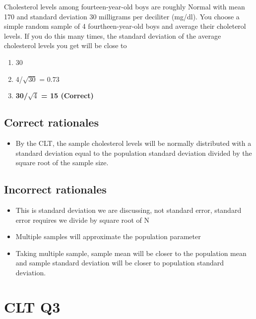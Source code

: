 \documentclass[letterpaper,9pt,twoside,printwatermark=false]{pinp}
\providecommand{\tightlist}{%
  \setlength{\itemsep}{0pt}\setlength{\parskip}{0pt}}
\begin{document}
Cholesterol levels among fourteen-year-old boys are roughly Normal with
mean 170 and standard deviation 30 milligrams per deciliter (mg/dl). You
choose a simple random sample of 4 fourtheen-year-old boys and average
their choleterol levels. If you do this many times, the standard
deviation of the average cholesterol levels you get will be close to

\begin{enumerate}
\def\labelenumi{\alph{enumi})}
\tightlist
\item
  30
\item
  4/\(\sqrt{30}\) = 0.73
\item
  \textbf{30/\(\sqrt{4}\) = 15 (Correct)}
\end{enumerate}

\subsection{Correct rationales}\label{correct-rationales-3}

\begin{itemize}
\tightlist
\item
  By the CLT, the sample cholesterol levels will be normally distributed
  with a standard deviation equal to the population standard deviation
  divided by the square root of the sample size.
\end{itemize}

\subsection{Incorrect rationales}\label{incorrect-rationales-3}

\begin{itemize}
\tightlist
\item
  This is standard deviation we are discussing, not standard error,
  standard error requires we divide by square root of N
\item
  Multiple samples will approximate the population parameter
\item
  Taking multiple sample, sample mean will be closer to the population
  mean and sample standard deviation will be closer to population
  standard deviation.
\end{itemize}

\section{CLT Q3}\label{clt-q3}
\end{document}
